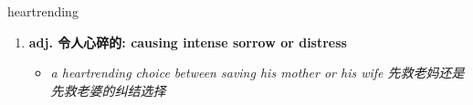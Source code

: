 
\begin{frame}
{\huge heartrending}
\begin{center}
\begin{enumerate}\Large
  \item \textbf{adj. 令人心碎的: causing intense sorrow or distress}
  \begin{itemize}
    \item \em{\Large{a heartrending choice between saving his mother or his wife 先救老妈还是先救老婆的纠结选择}}
  \end{itemize}
\end{enumerate}
\end{center}
\end{frame}
